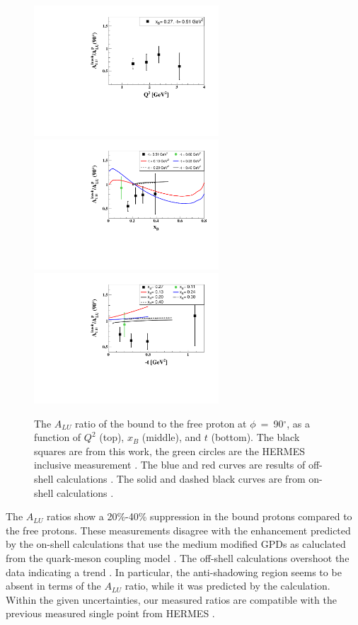 \documentclass[twocolumn,nofootinbib,showpacs,prl,superscriptaddress,secnumarabic,amssymb,nobibnotes,aps,floatfix]{revtex4}
\begin{document}
\begin{figure}[tb]
\centering
\includegraphics[width=6.9cm]{figs/ALU_ratioInc_Q2_shortscenrario.pdf}\\
\includegraphics[width=6.9cm]{figs/ALU_ratioInc_x_shortscenrario.pdf}\\
\includegraphics[width=6.9cm]{figs/ALU_ratioInc_t_shortscenrario.pdf}
\caption{ The $A_{LU}$ ratio of the bound to the free proton at 
   $\phi$~=~90$^{\circ}$, as a function of $Q^2$ (top), $x_B$ (middle), and $t$ 
   (bottom). The black squares are from this work, the green circles are the 
   HERMES inclusive measurement \cite{Airapetian}. The blue and red curves are 
   results of off-shell calculations \cite{simonetta_2}. The solid and dashed 
   black curves are from on-shell calculations \cite{Guzey:2008fe}.} 
   \label{fig:incoh_EMC_ratio_ALU_proton}
\end{figure}

The $A_{LU}$ ratios show a 20\%-40\% suppression in the bound protons compared 
to the free protons. These measurements disagree with the enhancement predicted 
by the on-shell calculations that use the medium modified GPDs as caluclated 
from the quark-meson coupling model \cite{Guzey:2008fe}. The off-shell 
calculations overshoot the data indicating a trend \cite{simonetta_2}. In
particular, the anti-shadowing region seems to be absent in terms of the 
$A_{LU}$ ratio, while it was predicted by the calculation. Within the given 
uncertainties, our measured ratios are compatible with the previous measured 
single point from HERMES \cite{Airapetian}.
\end{document}
